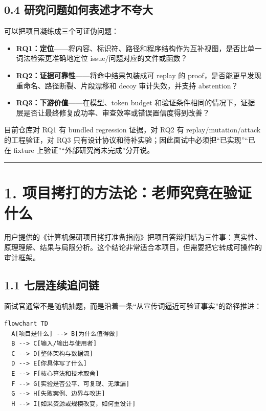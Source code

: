 \documentclass[UTF8,12pt,openany]{ctexbook}
\begin{document}
\subsection{0.4 研究问题如何表述才不夸大}

可以把项目凝练成三个可证伪问题：\par

\begin{itemize}
\item \textbf{RQ1：定位}——将内容、标识符、路径和程序结构作为互补视图，是否比单一词法检索更准确地定位 issue/问题对应的文件或函数？
\item \textbf{RQ2：证据可靠性}——将命中结果包装成可 replay 的 proof，是否能更早发现重命名、路径断裂、片段漂移和 decoy 审计失效，并支持 abstention？
\item \textbf{RQ3：下游价值}——在模型、token budget 和验证条件相同的情况下，证据层是否让最终修复成功率、审查效率或错误置信度得到改善？
\end{itemize}

目前仓库对 RQ1 有 bundled regression 证据，对 RQ2 有 replay/mutation/attack 的工程验证，对 RQ3 只有设计协议和待补实验；因此面试中必须把“已实现”“已在 fixture 上验证”“外部研究尚未完成”分开说。\par

\hrule

\section{1. 项目拷打的方法论：老师究竟在验证什么}

用户提供的《计算机保研项目拷打准备指南》把项目答辩归结为三件事：真实性、原理理解、结果与局限分析。这个结论非常适合本项目，但需要把它转成可操作的审计框架。\par

\subsection{1.1 七层连续追问链}

面试官通常不是随机抽题，而是沿着一条“从宣传词逼近可验证事实”的路径推进：\par

\begin{lstlisting}
flowchart TD
  A[项目是什么] --> B[为什么值得做]
  B --> C[输入/输出与使用者]
  C --> D[整体架构与数据流]
  D --> E[你具体写了什么]
  E --> F[核心算法和技术取舍]
  F --> G[实验是否公平、可复现、无泄漏]
  G --> H[失败案例、边界与改进]
  H --> I[如果资源或规模改变，如何重设计]
\end{lstlisting}
\end{document}
